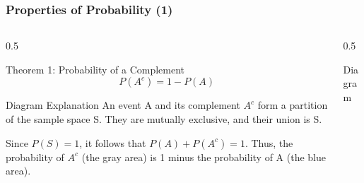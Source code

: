 \begin{frame}
    \frametitle{Properties of Probability (1)}
    \footnotesize
    \begin{columns}[T]
        \begin{column}{0.5\textwidth}
            \begin{block}{Theorem 1: Probability of a Complement}
                \[ P(A^c) = 1 - P(A) \]
            \end{block}
            
            \begin{block}{Diagram Explanation}
                An event A and its complement \(A^c\) form a partition of the sample space S. They are mutually exclusive, and their union is S.
                \vspace{0.5cm}
                
                Since \(P(S)=1\), it follows that \(P(A) + P(A^c) = 1\). Thus, the probability of \(A^c\) (the gray area) is 1 minus the probability of A (the blue area).
            \end{block}
        \end{column}
        
        \begin{column}{0.5\textwidth}
            \begin{block}{Diagram}
                \centering
            \end{block}
        \end{column}
    \end{columns}
\end{frame}

